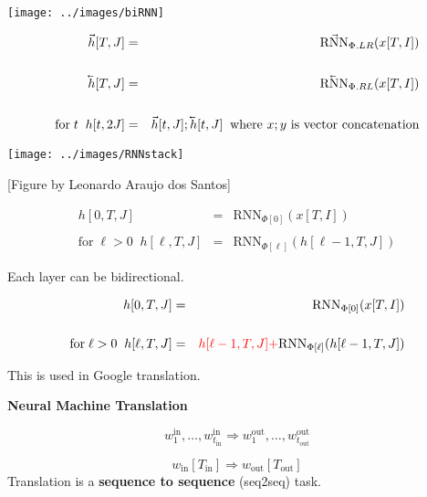 {\centerline{\texttt{[image: ../images/biRNN]}}

\begin{eqnarray*}
\vec{h}[T,J] & = & \vec{\mathrm{RNN}}_{\Phi.LR}(x[T,I]) \\
\\
\cev{h}[T,J] & = & \cev{\mathrm{RNN}}_{\Phi.RL}(x[T,I]) \\
\\
\mbox{for}\;t\;\;h[t,2J] & = & \vec{h}[t,J];\cev{h}[t,J]\;\;\mbox{where $x;y$ is vector concatenation}
\end{eqnarray*}


\centerline{\texttt{[image: ../images/RNNstack]}}
\centerline{\large [Figure by Leonardo Araujo dos Santos]}

\begin{eqnarray*}
h[0,T,J] & = & \mathrm{RNN}_{\Phi[0]}(x[T,I]) \\
\\
\mbox{for} \;\ell > 0\;\;h[\ell,T,J] & = & \mathrm{RNN}_{\Phi[\ell]}(h[\ell-1,T,J])
\end{eqnarray*}

Each layer can be bidirectional.



\begin{eqnarray*}
h[0,T,J] & = & \mathrm{RNN}_{\Phi[0]}(x[T,I]) \\
\\
\mbox{for} \;\ell > 0\;\;h[\ell,T,J] & = & {\color{red} h[\ell-1,T,J] +} \mathrm{RNN}_{\Phi[\ell]}(h[\ell-1,T,J])
\end{eqnarray*}

\vfill
This is used in Google translation.

\slide{}

\centerline{\bf Neural Machine Translation}



$$w^{\mathrm{in}}_1,\ldots,w^{\mathrm{in}}_{t_{\mathrm{in}}} \Rightarrow w^{\mathrm{out}}_1,\ldots,w^{\mathrm{out}}_{t_{\mathrm{out}}}$$

$$w_{\mathrm{in}}[T_{\mathrm{in}}] \Rightarrow w_{\mathrm{out}}[T_{\mathrm{out}}]$$
\vfill
Translation is a {\bf sequence to sequence} (seq2seq) task.

}
